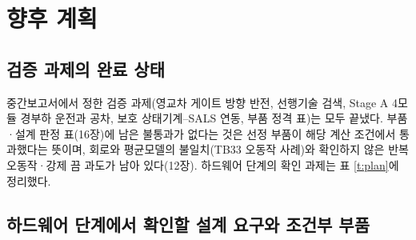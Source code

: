 \chapter{향후 계획}

\section{검증 과제의 완료 상태}

중간보고서에서 정한 검증 과제(영교차 게이트 방향 반전, 선행기술 검색, Stage A 4모듈 경부하 운전과 공차, 보호 상태기계–SALS 연동, 부품 정격 표)는 모두 끝냈다. 부품·설계 판정 표(16장)에 남은 불통과가 없다는 것은 선정 부품이 해당 계산 조건에서 통과했다는 뜻이며, 회로와 평균모델의 불일치(TB33 오동작 사례)와 확인하지 않은 반복 오동작·강제 끔 과도가 남아 있다(12장). 하드웨어 단계의 확인 과제는 표 \ref{t:plan}에 정리했다.

\section{하드웨어 단계에서 확인할 설계 요구와 조건부 부품}

